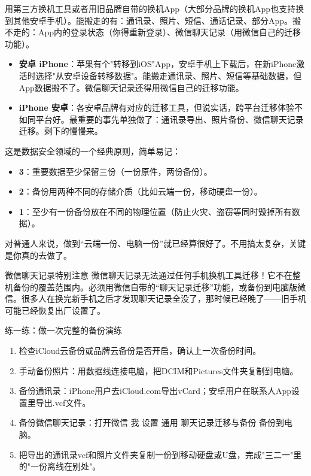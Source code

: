 
用第三方换机工具或者用旧品牌自带的换机App（大部分品牌的换机App也支持换到其他安卓手机）。能搬走的有：通讯录、照片、短信、通话记录、部分App。搬不走的：App内的登录状态（你得重新登录）、微信聊天记录（用微信自己的迁移功能）。


\begin{itemize}
  \item \textbf{安卓 iPhone}：苹果有个"转移到iOS"App，安卓手机上下载后，在新iPhone激活时选择"从安卓设备转移数据"。能搬走通讯录、照片、短信等基础数据，但App数据搬不了。微信聊天记录还得用微信自己的迁移功能。
  \item \textbf{iPhone 安卓}：各安卓品牌有对应的迁移工具，但说实话，跨平台迁移体验不如同平台好。最重要的事先单独做了：通讯录导出、照片备份、微信聊天记录迁移。剩下的慢慢来。
\end{itemize}


这是数据安全领域的一个经典原则，简单易记：

\begin{itemize}
  \item \textbf{3}：重要数据至少保留三份（一份原件，两份备份）。
  \item \textbf{2}：备份用两种不同的存储介质（比如云端一份，移动硬盘一份）。
  \item \textbf{1}：至少有一份备份放在不同的物理位置（防止火灾、盗窃等同时毁掉所有数据）。
\end{itemize}

对普通人来说，做到“云端一份、电脑一份”就已经算很好了。不用搞太复杂，关键是你真的去做了。

\begin{tcbwarn}{微信聊天记录特别注意}
微信聊天记录无法通过任何手机换机工具迁移！它不在整机备份的覆盖范围内。必须用微信自带的“聊天记录迁移”功能，或备份到电脑版微信。很多人在换完新手机之后才发现聊天记录全没了，那时候已经晚了——旧手机可能已经恢复出厂设置了。

\end{tcbwarn}

\begin{tcbpractice}{练一练：做一次完整的备份演练}
\begin{enumerate}
  \item 检查iCloud云备份或品牌云备份是否开启，确认上一次备份时间。
  \item 手动备份照片：用数据线连接电脑，把DCIM和Pictures文件夹复制到电脑。
  \item 备份通讯录：iPhone用户去iCloud.com导出vCard；安卓用户在联系人App设置里导出.vcf文件。
  \item 备份微信聊天记录：打开微信 我 设置 通用 聊天记录迁移与备份 备份到电脑。
  \item 把导出的通讯录vcf和照片文件夹复制一份到移动硬盘或U盘，完成"三二一"里的"一份离线在别处"。
\end{enumerate}

\end{tcbpractice}

